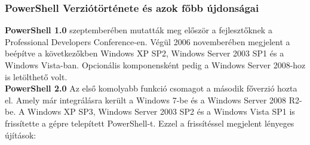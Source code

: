 \documentclass[12pt,oneside,justify,table]{book}
\begin{document}
\subsubsection{PowerShell Verziótörténete és azok főbb újdonságai}
\noindent\textbf{PowerShell 1.0}
 szeptemberében mutatták meg először a fejlesztőknek a Professional Developers Conference-en. 
Végül 2006 novemberében megjelent a beépítve a következőkben Windows XP SP2, Windows Server 2003 SP1 és a Windows Vista-ban. Opcionális komponensként pedig a Windows Server 2008-hoz is letölthető volt.\\
\break
\noindent\textbf{PowerShell 2.0}
\newline Az első komolyabb funkció csomagot a második főverzió hozta el. Amely már integrálásra került a Windows 7-be és a Windows Server 2008 R2-be. A Windows XP SP3, Windows Server 2003 SP2 és a Windows Vista SP1 is frissítette a gépre telepített PowerShell-t.
Ezzel a frissítéssel megjelent lényeges újítások:
\end{document}
